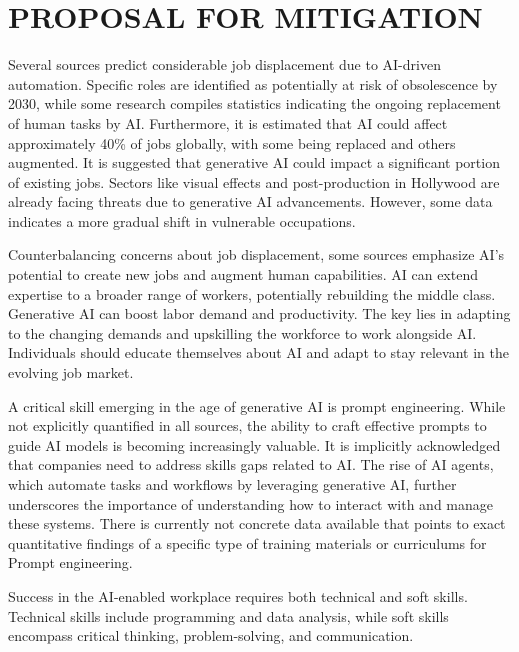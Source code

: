 \documentclass[a4paper,headinclude=on,footinclude=on,12pt,oneside]{scrbook}
\begin{document}
\section*{PROPOSAL FOR MITIGATION}


Several sources predict considerable job displacement due to AI-driven automation. Specific roles are identified as potentially at risk of obsolescence by 2030, while some research compiles statistics indicating the ongoing replacement of human tasks by AI. Furthermore, it is estimated that AI could affect approximately 40\% of jobs globally, with some being replaced and others augmented. It is suggested that generative AI could impact a significant portion of existing jobs. Sectors like visual effects and post-production in Hollywood are already facing threats due to generative AI advancements. However, some data indicates a more gradual shift in vulnerable occupations.


Counterbalancing concerns about job displacement, some sources emphasize AI’s potential to create new jobs and augment human capabilities. AI can extend expertise to a broader range of workers, potentially rebuilding the middle class. Generative AI can boost labor demand and productivity. The key lies in adapting to the changing demands and upskilling the workforce to work alongside AI. Individuals should educate themselves about AI and adapt to stay relevant in the evolving job market.


A critical skill emerging in the age of generative AI is prompt engineering. While not explicitly quantified in all sources, the ability to craft effective prompts to guide AI models is becoming increasingly valuable. It is implicitly acknowledged that companies need to address skills gaps related to AI. The rise of AI agents, which automate tasks and workflows by leveraging generative AI, further underscores the importance of understanding how to interact with and manage these systems. There is currently not concrete data available that points to exact quantitative findings of a specific type of training materials or curriculums for Prompt engineering.


Success in the AI-enabled workplace requires both technical and soft skills. Technical skills include programming and data analysis, while soft skills encompass critical thinking, problem-solving, and communication. 
\end{document}
